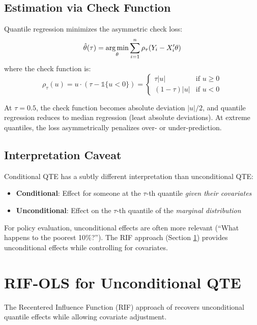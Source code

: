 \subsection{Estimation via Check Function}

Quantile regression minimizes the asymmetric check loss:
\[
\hat{\theta}(\tau) = \operatorname*{arg\,min}_{\theta} \sum_{i=1}^n \rho_\tau(Y_i - X_i'\theta)
\]
where the check function is:
\[
\rho_\tau(u) = u \cdot (\tau - \mathbb{1}\{u < 0\}) =
\begin{cases}
\tau |u| & \text{if } u \geq 0 \\
(1-\tau) |u| & \text{if } u < 0
\end{cases}
\]

\begin{insight}
At $\tau = 0.5$, the check function becomes absolute deviation $|u|/2$, and quantile regression reduces to median regression (least absolute deviations). At extreme quantiles, the loss asymmetrically penalizes over- or under-prediction.
\end{insight}

\subsection{Interpretation Caveat}

\begin{remark}
Conditional QTE has a subtly different interpretation than unconditional QTE:
\begin{itemize}
    \item \textbf{Conditional}: Effect for someone at the $\tau$-th quantile \emph{given their covariates}
    \item \textbf{Unconditional}: Effect on the $\tau$-th quantile of the \emph{marginal distribution}
\end{itemize}
For policy evaluation, unconditional effects are often more relevant (``What happens to the poorest 10\%?''). The RIF approach (Section \ref{sec:qte-rif}) provides unconditional effects while controlling for covariates.
\end{remark}

\section{RIF-OLS for Unconditional QTE}
\label{sec:qte-rif}

The Recentered Influence Function (RIF) approach of \citet{firpo2009unconditional} recovers unconditional quantile effects while allowing covariate adjustment.

